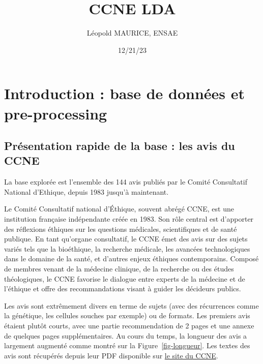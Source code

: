 \documentclass[
  letterpaper,
  DIV=11,
  numbers=noendperiod]{scrartcl}
\title{CCNE LDA}
\author{Léopold MAURICE, ENSAE}
\date{12/21/23}
\begin{document}
\maketitle
\ifdefined\Shaded\renewenvironment{Shaded}{\begin{tcolorbox}[interior hidden, frame hidden, enhanced, boxrule=0pt, breakable, borderline west={3pt}{0pt}{shadecolor}, sharp corners]}{\end{tcolorbox}}\fi

\hypertarget{introduction-base-de-donnuxe9es-et-pre-processing}{%
\section{Introduction : base de données et
pre-processing}\label{introduction-base-de-donnuxe9es-et-pre-processing}}

\hypertarget{pruxe9sentation-rapide-de-la-base-les-avis-du-ccne}{%
\subsection{Présentation rapide de la base : les avis du
CCNE}\label{pruxe9sentation-rapide-de-la-base-les-avis-du-ccne}}

La base explorée est l'ensemble des 144 avis publiés par le Comité
Consultatif National d'Ethique, depuis 1983 jusqu'à maintenant.

Le Comité Consultatif national d'Éthique, souvent abrégé CCNE, est une
institution française indépendante créée en 1983. Son rôle central est
d'apporter des réflexions éthiques sur les questions médicales,
scientifiques et de santé publique. En tant qu'organe consultatif, le
CCNE émet des avis sur des sujets variés tels que la bioéthique, la
recherche médicale, les avancées technologiques dans le domaine de la
santé, et d'autres enjeux éthiques contemporains. Composé de membres
venant de la médecine clinique, de la recherche ou des études
théologiques, le CCNE favorise le dialogue entre experts de la médecine
et de l'éthique et offre des recommandations visant à guider les
décideurs publics.

Les avis sont extrêmement divers en terme de sujets (avec des
récurrences comme la génétique, les cellules souches par exemple) ou de
formats. Les premiers avis étaient plutôt courts, avec une partie
recommendation de 2 pages et une annexe de quelques pages
supplémentaires. Au cours du temps, la longueur des avis a largement
augmenté comme montré sur la Figure~\ref{fig-longueur}. Les textes des
avis sont récupérés depuis leur PDF disponible sur
\href{https://www.ccne-ethique.fr/}{le site du CCNE}.
\end{document}
